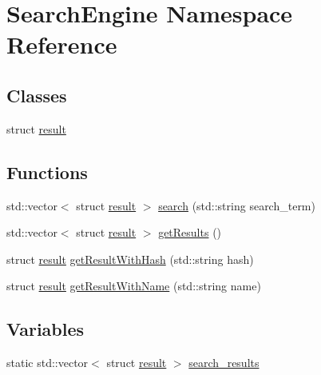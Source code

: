 \hypertarget{namespaceSearchEngine}{
\section{SearchEngine Namespace Reference}
\label{namespaceSearchEngine}
}
\subsection*{Classes}
\begin{DoxyCompactItemize}
\item 
struct \hyperlink{structSearchEngine_1_1result}{result}
\end{DoxyCompactItemize}
\subsection*{Functions}
\begin{DoxyCompactItemize}
\item 
std::vector$<$ struct \hyperlink{structSearchEngine_1_1result}{result} $>$ \hyperlink{namespaceSearchEngine_a8042f2fcffc7c08c54d81c27c3142dad}{search} (std::string search\_\-term)
\item 
std::vector$<$ struct \hyperlink{structSearchEngine_1_1result}{result} $>$ \hyperlink{namespaceSearchEngine_a83cc228348eb97a22e8ab41aef85ef45}{getResults} ()
\item 
struct \hyperlink{structSearchEngine_1_1result}{result} \hyperlink{namespaceSearchEngine_a10dc85e3cb31095c8081a42f4f88ab0e}{getResultWithHash} (std::string hash)
\item 
struct \hyperlink{structSearchEngine_1_1result}{result} \hyperlink{namespaceSearchEngine_ace749b9778ce1e51ea18b2451b56397b}{getResultWithName} (std::string name)
\end{DoxyCompactItemize}
\subsection*{Variables}
\begin{DoxyCompactItemize}
\item 
static std::vector$<$ struct \hyperlink{structSearchEngine_1_1result}{result} $>$ \hyperlink{namespaceSearchEngine_a81abb8ad4470831c92858337736559ec}{search\_\-results}
\end{DoxyCompactItemize}


